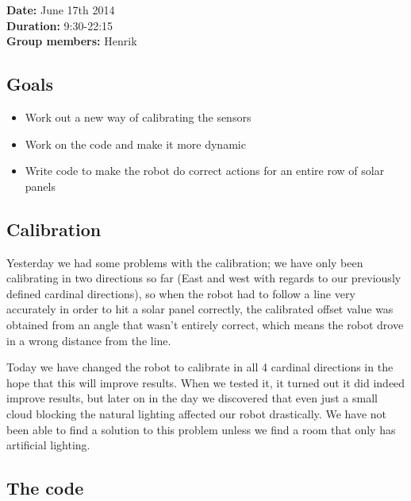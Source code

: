 \textbf{Date:} June 17th 2014\\\textbf{Duration:}
9:30-22:15\\\textbf{Group members:} Henrik

\subsection{Goals}

\begin{itemize}
\itemsep1pt\parskip0pt
\item
  Work out a new way of calibrating the sensors
\item
  Work on the code and make it more dynamic
\item
  Write code to make the robot do correct actions for an entire row of
  solar panels
\end{itemize}

\subsection{Calibration}

Yesterday we had some problems with the calibration; we have only been
calibrating in two directions so far (East and west with regards to our
previously defined cardinal directions), so when the robot had to follow
a line very accurately in order to hit a solar panel correctly, the
calibrated offset value was obtained from an angle that wasn't entirely
correct, which means the robot drove in a wrong distance from the line.

Today we have changed the robot to calibrate in all 4 cardinal
directions in the hope that this will improve results. When we tested
it, it turned out it did indeed improve results, but later on in the day
we discovered that even just a small cloud blocking the natural lighting
affected our robot drastically. We have not been able to find a solution
to this problem unless we find a room that only has artificial lighting.

\subsection{The code}

